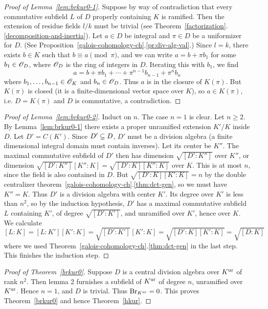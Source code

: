 \begin{proof}[Proof of Lemma~\ref{lem:brkur0-1}]
Suppose by way of contradiction that every commutative subfield $L$ of $D$ properly containing $K$ is ramified. Then the extension of residue fields $l/k$ must be trivial (see Theorem~\ref{factorization}.\ref{decomposition-and-inertia}). Let $a\in D$ be integral and $\pi\in D$ be a uniformizer for $D$.
(See Proposition~\ref{galois-cohomology-ch}.\ref{pr:div-alg-val}.) 
Since $l=k$, there exists $b\in K$ such that $b\equiv a\pmod{\pi}$, and we can write $a=b+\pi b_1$ for some $b_1\in \mathscr{O}_D$, where $\mathscr{O}_D$ is the ring of integers in $D$. Iterating this with $b_1$, we find 
\[
a=b+\pi b_1+\cdots +\pi^{n-1} b_{n-1}+\pi^n b_n
\]
where $b_1,\ldots, b_{n-1}\in \mathscr{O}_K$ and $b_n\in \mathscr{O}_D$. Thus $a$ is in the closure of $K(\pi)$. But $K(\pi)$ is closed (it is a finite-dimensional vector space over $K$), so $a\in K(\pi)$, i.e. $D=K(\pi)$ and $D$ is commutative, a contradiction.
\end{proof}
\begin{proof}[Proof of Lemma~\ref{lem:brkur0-2}]
Induct on $n$. The case $n=1$ is clear. Let $n\ge 2$. By Lemma~\ref{lem:brkur0-1} there exists a proper unramified extension $K'/K$ inside $D$. Let $D'=C(K')$. Since $D'\subseteq D$, $D'$ must be a division algebra (a finite dimensional integral domain must contain inverses). Let its center be $K''$. The maximal commutative subfield of $D'$ then has dimension $\sqrt{[D':K'']}$ over $K''$, or dimension $\sqrt{[D':K'']}[K'':K]=\sqrt{[D':K][K'':K]}$ over $K$. This is at most $n$, since the field is also contained in $D$. But $\sqrt{[D':K][K':K]}=n$ by the double centralizer theorem~\ref{galois-cohomology-ch}.\ref{thm:dct-gen}, so we must have $K''=K$. Thus $D'$ is a division algebra with center $K'$.
Its degree over $K'$ is less than $n^2$, so %
by the induction hypothesis, $D'$ has a maximal commutative subfield $L$ containing $K'$, of degree $\sqrt{[D':K']}$, and unramified over $K'$, hence over $K$. We calculate
\[
[L:K]=[L:K'][K':K]=\sqrt{[D':K']}[K':K]=\sqrt{[D':K][K':K]}=\sqrt{[D:K]}
\]
where we used Theorem~\ref{galois-cohomology-ch}.\ref{thm:dct-gen} in the last step. This finishes the induction step.
\end{proof}
\begin{proof}[Proof of Theorem~\ref{brkur0}]
Suppose $D$ is a central division algebra over $K^{\text{ur}}$ of rank $n^2$. Then lemma 2 furnishes a subfield of $K^{\text{ur}}$ of degree $n$, unramified over $K^{\text{ur}}$. Hence $n=1$, and $D$ is trivial. Thus $\operatorname{Br}_{K^{\text{ur}}}=0$. This proves Theorem~\ref{brkur0} and hence Theorem~\ref{hkur}.
\end{proof}
